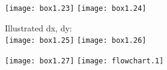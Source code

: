 \documentclass{article}
\begin{document}
\texttt{[image: box1.23]}
\texttt{[image: box1.24]}

\pagebreak
Illustrated dx, dy:\\
\texttt{[image: box1.25]}
\pagebreak
\texttt{[image: box1.26]}

\pagebreak
\texttt{[image: box1.27]}
\pagebreak
\texttt{[image: flowchart.1]}
\end{document}
